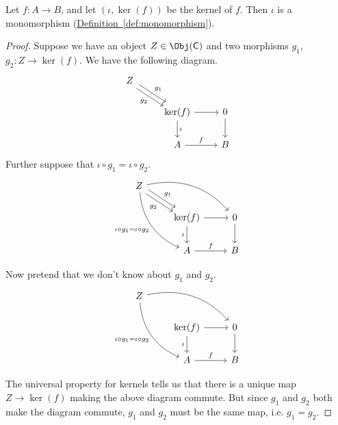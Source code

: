 \documentclass[notes.tex]{subfiles}
\begin{document}
\begin{lemma}
  \label{lemma:canonicalinjectionismono}
  Let $f\colon A \to B$, and let $(\iota, \ker(f))$ be the kernel of $f$. Then $\iota$ is a monomorphism (\hyperref[def:monomorphism]{Definition~\ref*{def:monomorphism}}).
\end{lemma}
\begin{proof}
  Suppose we have an object $Z \in \Obj(\mathsf{C})$ and two morphisms $g_{1}$, $g_{2}\colon Z \to \ker(f)$. We have the following diagram.
  \begin{equation*}
    \begin{tikzcd}
      Z
      \arrow[rd, shift left, "g_{1}"]
      \arrow[rd, shift right, swap, "g_{2}"]
      \\
      & \ker(f)
      \arrow[r]
      \arrow[d, "\iota"]
      & 0
      \arrow[d]
      \\
      & A
      \arrow[r, "f"]
      & B
    \end{tikzcd}
  \end{equation*}
  Further suppose that $\iota \circ g_{1} = \iota \circ g_{2}$.
  \begin{equation*}
    \begin{tikzcd}
      Z
      \arrow[rd, shift left, "g_{1}"]
      \arrow[rd, shift right, swap, "g_{2}"]
      \arrow[rrd, bend left]
      \arrow[rdd, bend right, swap, "\iota \circ g_{1} = \iota \circ g_{2}"]
      \\
      & \ker(f)
      \arrow[r]
      \arrow[d, swap, "\iota"]
      & 0
      \arrow[d]
      \\
      & A
      \arrow[r, "f"]
      & B
    \end{tikzcd}
  \end{equation*}

  Now pretend that we don't know about $g_{1}$ and $g_{2}$.
  \begin{equation*}
    \begin{tikzcd}
      Z
      \arrow[rrd, bend left]
      \arrow[rdd, bend right, swap, "\iota \circ g_{1} = \iota \circ g_{2}"]
      \\
      & \ker(f)
      \arrow[r]
      \arrow[d, swap, "\iota"]
      & 0
      \arrow[d]
      \\
      & A
      \arrow[r, "f"]
      & B
    \end{tikzcd}
  \end{equation*}

  The universal property for kernels tells us that there is a unique map $Z \to \ker(f)$ making the above diagram commute. But since $g_{1}$ and $g_{2}$ both make the diagram commute, $g_{1}$ and $g_{2}$ must be the same map, i.e. $g_{1} = g_{2}$.
\end{proof}
\end{document}
